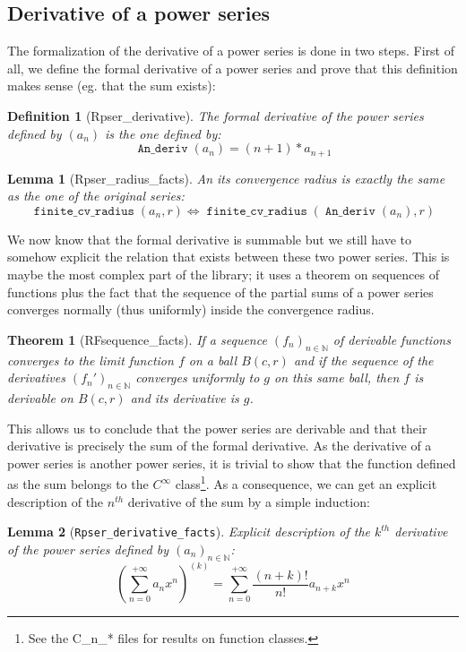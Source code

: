 \documentclass[submission,copyright]{eptcs}
\newcommand{\N}{\mathbb{N}}
\DeclareMathOperator{\D}{\mathtt{An\_deriv}}
\DeclareMathOperator{\fcvr}{\mathtt{finite\_cv\_radius}}
\newtheorem{definition}{Definition}
\newtheorem{lemma}{Lemma}
\newtheorem{theorem}{Theorem}
\begin{document}
\subsection{Derivative of a power series}

The formalization of the derivative of a power series is done in two steps.
First of all, we define the formal derivative of a power series and prove
that this definition makes sense (eg. that the sum exists):

\begin{definition}[Rpser\_derivative] The formal derivative of the power
series defined by $(a_n)$ is the one defined by:
$$\D{}(a_n) = (n + 1) * a_{n+1}$$
\end{definition}

\begin{lemma}[Rpser\_radius\_facts] An its convergence radius is exactly
the same as the one of the original series: $$\fcvr{}(a_n,r) \Leftrightarrow
\fcvr{}(\D{}(a_n),r)$$\end{lemma}

We now know that the formal derivative is summable but we still have to
somehow explicit the relation that exists between these two power series.
This is maybe the most complex part of the library; it uses a theorem on
sequences of functions plus the fact that the sequence of the partial
sums of a power series converges normally (thus uniformly) inside the
convergence radius.

\begin{theorem}[RFsequence\_facts] If a sequence $(f_n)_{n \in \N}$ of
derivable functions converges to the limit function $f$ on a ball $B(c,r)$
and if the sequence of the derivatives $(f_n')_{n \in \N}$ converges
uniformly to $g$ on this same ball, then $f$ is derivable on $B(c,r)$ and
its derivative is $g$.\end{theorem}

This allows us to conclude that the power series are derivable and that
their derivative is precisely the sum of the formal derivative.
As the derivative of a power series is another power series, it is
trivial to show that the function defined as the sum belongs to the
$C^{\infty}$ class\footnote{See the C\_n\_* files for results on
function classes.}. As a consequence, we can get an explicit description
of the $n^{th}$ derivative of the sum by a simple induction:

\begin{lemma}[\texttt{Rpser\_derivative\_facts}] Explicit description of the
$k^{th}$ derivative of the power series defined by $(a_n)_{n\in \N}$:
$$(\sum_{n=0}^{+\infty} a_n x^n)^{(k)} = \sum_{n=0}^{+\infty}
\frac{(n + k)!}{n!} a_{n+k} x^n$$
\end{lemma}
\end{document}
